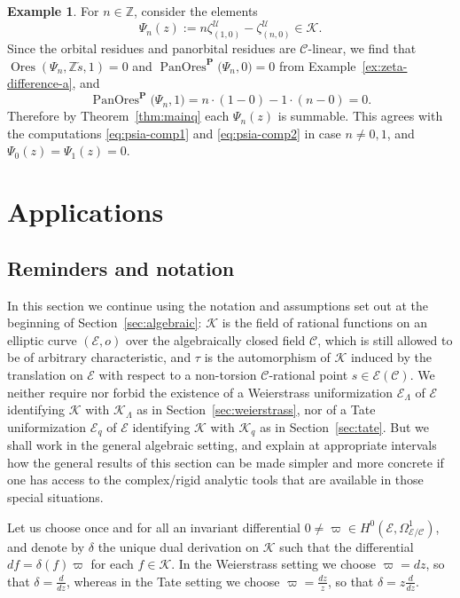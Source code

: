 \documentclass[preprint,12pt]{elsarticle}
\numberwithin{equation}{section} %
\theoremstyle{theorem}
\theoremstyle{definition}
\newtheorem{example}[theorem]{Example}
\newcommand{\Ca}{\mathcal{C}} %
\newcommand{\bk}{\mathcal{K}} %
\newcommand{\bkl}{\bk_{\Lambda}} %
\newcommand{\bkq}{\bk_{q}} %
\newcommand{\ec}{\mathcal{E}} %
\newcommand{\idec}{{o}} %
\newcommand{\ecl}{\ec_{\Lambda}} %
\newcommand{\ecq}{\ec_{q}}
\newcommand{\Z}{\mathbb{Z}} %
\newcommand{\za}[2]{\zeta^{\mathcal{U}}_{( {#1} , {#2} )}}
\DeclareMathOperator{\ores}{Ores}
\DeclareMathOperator{\pano}{PanOres}
\begin{document}
 \begin{example} \label{ex:psi-sum-a}For $n\in\Z$, consider the elements
    \[\Psi_n(z):=n\za{1}{0}-\za{n}{0}\in\bk.\] Since the orbital residues and panorbital residues are $\Ca$-linear, we find that $\ores(\Psi_n,\Z\check{s},1)=0$ and $\pano^\mathbf{P}\bigl(\Psi_n,0\bigr)=0$ from Example~\ref{ex:zeta-difference-a}, and \[\pano^\mathbf{P}\bigl(\Psi_n,1\bigr)=n\cdot(1-0)-1\cdot(n-0)=0.\] Therefore by Theorem~\ref{thm:mainq} each $\Psi_n(z)$ is summable. This agrees with the computations \eqref{eq:psia-comp1} and \eqref{eq:psia-comp2} in case $n\neq0,1$, and $\Psi_0(z)=\Psi_1(z)=0$. 
\end{example}




\section{Applications} \label{sec:applications}

\subsection{Reminders and notation}

In this section we continue using the notation and assumptions set out at the beginning of Section~\ref{sec:algebraic}: $\bk$ is the field of rational functions on an elliptic curve $(\ec,\idec)$ over the algebraically closed field $\Ca$, which is still allowed to be of arbitrary characteristic, and $\tau$ is the automorphism of $\bk$ induced by the translation on $\ec$ with respect to a non-torsion $\Ca$-rational point $s\in\ec(\Ca)$. We neither require nor forbid the existence of a Weierstrass uniformization $\ecl$ of $\ec$ identifying $\bk$ with $\bkl$ as in Section~\ref{sec:weierstrass}, nor of a Tate uniformization $\ecq$ of $\ec$ identifying $\bk$ with $\bkq$ as in Section~\ref{sec:tate}. But we shall work in the general algebraic setting, and explain at appropriate intervals how the general results of this section can be made simpler and more concrete if one has access to the complex/rigid analytic tools that are available in those special situations.

Let us choose once and for all an invariant differential $0\neq \varpi\in H^0(\ec,\Omega^1_{\ec/\Ca})$, and denote by $\delta$ the unique dual derivation on $\bk$ such that the differential $df=\delta(f)\varpi$ for each $f\in\bk$. In the Weierstrass setting we choose $\varpi=dz$, so that $\delta=\frac{d}{dz}$, whereas in the Tate setting we choose $\varpi=\frac{dz}{z}$, so that $\delta=z\frac{d}{dz}$.
\end{document}

